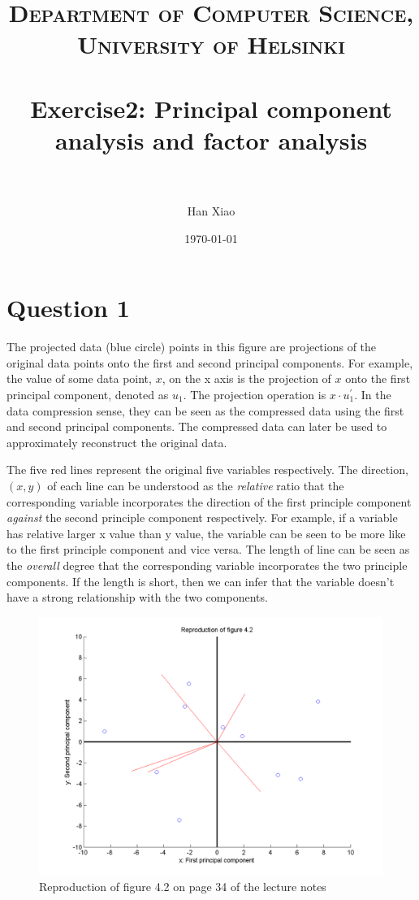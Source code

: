 \documentclass[paper=a4, fontsize=11pt]{scrartcl} %
\title{	
\normalfont \normalsize 
\textsc{Department of Computer Science, University of Helsinki} \\ [25pt] %
\horrule{0.5pt} \\[0.4cm] %
\huge Exercise2: Principal component analysis and factor analysis \\ %
\horrule{2pt} \\[0.5cm] %
}
\author{Han Xiao} %
\date{\normalsize\today} %
\numberwithin{equation}{section} %
\numberwithin{figure}{section} %
\numberwithin{table}{section} %
\begin{document}
\maketitle %


\section{Question 1}

The projected data (blue circle) points in this figure are projections of the original data points onto the first and second principal components. For example, the value of some data point, $x$, on the x axis is the projection of $x$ onto the first principal component, denoted as $u_1$. The projection operation is $x \cdot u_1^{'}$. In the data compression sense, they can be seen as the compressed data using the first and second principal components. The compressed data can later be used to approximately reconstruct the original data. \newline

The five red lines represent the original five variables respectively. The direction, $(x, y)$ of each line can be understood as the {\em relative} ratio that the corresponding variable incorporates the direction of the first principle component {\em against} the second principle component respectively. For example, if a variable has relative larger x value than y value, the variable can be seen to be more like to the first principle component and vice versa. The length of line can be seen as the {\em overall} degree that the corresponding variable incorporates the two principle components. If the length is short, then we can infer that the variable doesn't have a strong relationship with the two components.

\begin{figure}[H]
  \centering
  \includegraphics[scale=.7]{reproduct42}
  \caption{Reproduction of figure 4.2 on page 34 of the lecture notes}
\end{figure}
\end{document}
